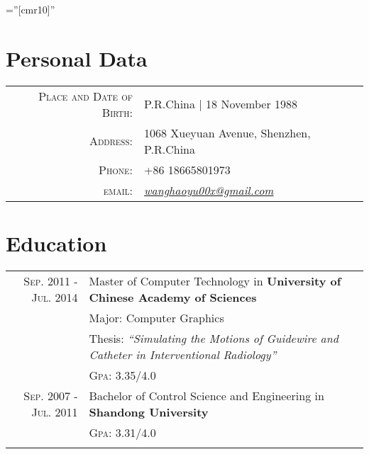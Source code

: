 \documentclass[a4paper,10pt]{article} %
\begin{document}
\pagestyle{empty} %

\font\fb=''[cmr10]'' %


\par{\bigskip\par} %

\section{Personal Data}

\begin{tabular}{rl}
\textsc{Place and Date of Birth:} & P.R.China  | 18 November 1988 \\
\textsc{Address:} & 1068 Xueyuan Avenue, Shenzhen, P.R.China \\
\textsc{Phone:} & +86 18665801973\\
\textsc{email:} & \href{mailto:wanghaoyu00x@gmail.com}{\emph{wanghaoyu00x@gmail.com}}
\end{tabular}


\section{Education}

\begin{tabular}{rl}	
\textsc{Sep. 2011 - Jul. 2014} & Master of Computer Technology in \textbf{University of Chinese Academy of Sciences}\\
& Major: Computer Graphics\\
& Thesis: \small \emph{``Simulating the Motions of Guidewire and Catheter in Interventional Radiology''} \\ 
& \textsc{Gpa}: 3.35/4.0 \\


\textsc{Sep. 2007 - Jul. 2011} & Bachelor of Control Science and Engineering in \textbf{Shandong University} \\
&\normalsize \textsc{Gpa}: 3.31/4.0 \\
&\\


\end{tabular}
\end{document}

